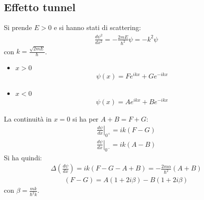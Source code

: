 \subsection{Effetto tunnel} %
Si prende $E>0$ e si hanno stati di scattering:
\begin{equation}\begin{split}
\frac{d\psi ^2}{dx^2}=-\frac{2mE}{\hbar ^2}\psi =-k^2\psi 
\end{split}\end{equation}
con $k=\frac{\sqrt{2mE}}{\hbar }$.

\begin{itemize}
\item $x>0$
\begin{equation}\begin{split}
\psi \left(x\right)=Fe^{ikx}+Ge^{-ikx}
\end{split}\end{equation}
\item $x<0$
\begin{equation}\begin{split}
\psi \left(x\right)=Ae^{ikx}+Be^{-ikx}
\end{split}\end{equation}
\end{itemize}

La continuità in $x=0$ si ha per $A+B=F+G$:
\begin{equation}\begin{split}
\left.\frac{d\psi }{dx}\right |_{0^+}=ik\left(F-G\right)
\end{split}\end{equation}
\begin{equation}\begin{split}
\left.\frac{d\psi }{dx}\right |_{0^-}=ik\left(A-B\right)
\end{split}\end{equation}
Si ha quindi:
\begin{equation}\begin{split}
\Delta \left(\frac{d\psi }{dx}\right)=ik\left(F-G-A+B\right)=-\frac{2m\alpha}{\hbar ^2}\left(A+B\right)
\end{split}\end{equation}
\begin{equation}\begin{split}
\left(F-G\right)=A\left(1+2i\beta\right)-B\left(1+2i\beta\right)
\end{split}\end{equation}
con $\beta =\frac{mk}{\hbar ^2k}$.

